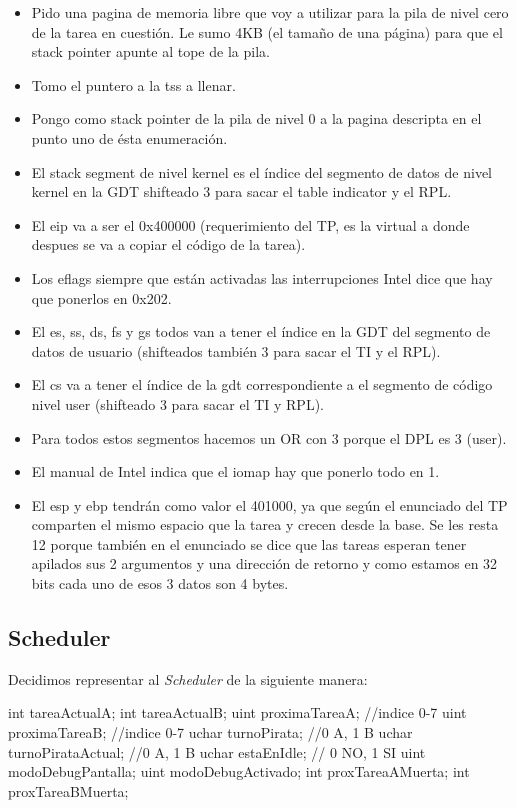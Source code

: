 \begin{itemize}

\item Pido una pagina de memoria libre que voy a utilizar para la pila de nivel cero de la tarea en cuestión. Le sumo 4KB (el tamaño de una página) para que el stack pointer apunte al tope de la pila.
\item Tomo el puntero a la tss a llenar.
\item Pongo como stack pointer de la pila de nivel 0 a la pagina descripta en el punto uno de ésta enumeración.
\item El stack segment de nivel kernel es el índice del segmento de datos de nivel kernel en la GDT shifteado 3 para sacar el table indicator y el RPL.
\item El eip va a ser el 0x400000 (requerimiento del TP, es la virtual a donde despues se va a copiar el código de la tarea).
\item Los eflags siempre que están activadas las interrupciones Intel dice que hay que ponerlos en 0x202.
\item El es, ss, ds, fs y gs todos van a tener el índice en la GDT del segmento de datos de usuario (shifteados también 3 para sacar el TI y el RPL).
\item El cs va a tener el índice de la gdt correspondiente a el segmento de código nivel user (shifteado 3 para sacar el TI y RPL).
\item Para todos estos segmentos hacemos un OR con 3 porque el DPL es 3 (user).
\item El manual de Intel indica que el iomap hay que ponerlo todo en 1.
\item El esp y ebp tendrán como valor el 401000, ya que según el enunciado del TP comparten el mismo espacio que la tarea y crecen desde la base. Se les resta 12 porque también en el enunciado se dice que las tareas esperan tener apilados sus 2 argumentos y una dirección de retorno y como estamos en 32 bits cada uno de esos 3 datos son 4 bytes.
 
\end{itemize}

\subsection{Scheduler}

Decidimos representar al \textit{Scheduler} de la siguiente manera:
\begin{algorithmic}
\State \tab int tareaActualA;
\State \tab int tareaActualB;
\State \tab uint proximaTareaA; //indice 0-7
\State \tab uint proximaTareaB; //indice 0-7
\State \tab uchar turnoPirata; //0 A, 1 B
\State \tab uchar turnoPirataActual; //0 A, 1 B
\State \tab uchar estaEnIdle; // 0 NO, 1 SI
\State \tab uint modoDebugPantalla;
\State \tab uint modoDebugActivado;
\State \tab int proxTareaAMuerta;
\State \tab int proxTareaBMuerta;
\end{algorithmic}

